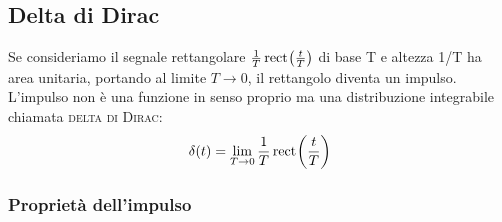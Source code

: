 \subsection{Delta di Dirac}
Se consideriamo il segnale rettangolare $\frac{1}{T} \,{\operatorname{rect}}^{}\!\left({\frac{t}{T}}\right)$ di base T e altezza 1/T ha area unitaria, portando al limite $T\to 0$, il rettangolo diventa un impulso. L'impulso non è una funzione in senso proprio ma una distribuzione integrabile chiamata \textsc{delta di Dirac}:
\begin{equation}
	\delta(t)=\lim\limits_{T\to 0}\frac{1}{T}\,{\operatorname{rect}}^{}\!\left({\frac{t}{T}}\right)
\end{equation}

\subsubsection{Proprietà dell'impulso}
